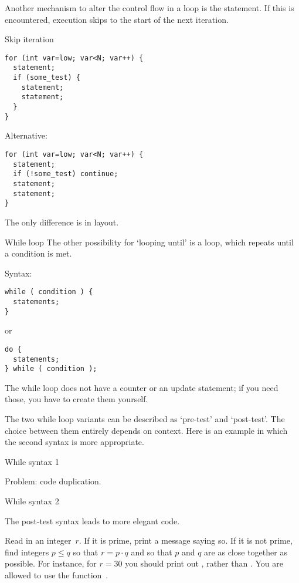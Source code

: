 Another mechanism to alter the control flow in a loop is the
 statement. If this is encountered, execution
skips to the start of the next iteration.

\begin{block}{Skip iteration}
  \label{sl:for-cont}
\begin{lstlisting}
for (int var=low; var<N; var++) {
  statement;
  if (some_test) {
    statement;
    statement;
  }
}
\end{lstlisting}
Alternative:
\begin{lstlisting}
for (int var=low; var<N; var++) {
  statement;
  if (!some_test) continue;
  statement;
  statement;
}
\end{lstlisting}
The only difference is in layout.
\end{block}

\begin{block}{While loop}
  \label{sl:while}
  The other possibility for `looping until' is a
   loop, which repeats until a condition is met.

  Syntax:
\begin{lstlisting}
while ( condition ) {
  statements;
}
\end{lstlisting}
or
\begin{lstlisting}
do {
  statements;
} while ( condition );
\end{lstlisting}
The while loop does not have a counter or an update statement; if you
need those, you have to create them yourself.
\end{block}

The two while loop variants can be described as `pre-test' and
`post-test'. The choice between them entirely depends on context. Here
is an example in which the second syntax is more appropriate.

\begin{block}{While syntax 1}
  \label{sl:while2}

  Problem: code duplication.
\end{block}

\begin{block}{While syntax 2}
  \label{sl:while3}

  The post-test syntax leads to more elegant code.
\end{block}

\begin{exercise}
  \label{ex:squaregrid}
  Read in an integer~$r$. If it is prime, print a message saying so.
  If it is not prime, find integers $p\leq q$ so that $r=p\cdot q$ and so
  that $p$ and $q$ are as close together as possible.
  For instance, for $r=30$ you should print out , rather than
  . You are allowed to use the function~.
\end{exercise}

